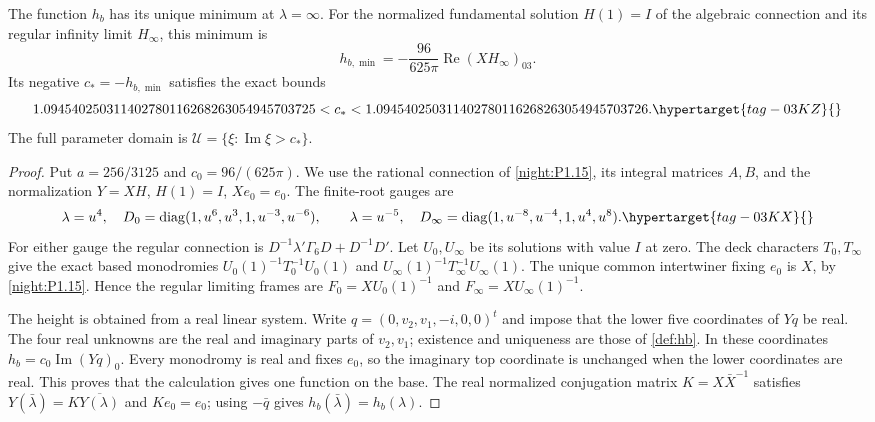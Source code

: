 \begin{theorem}
\hypertarget{tag-02QR}{}\label{night:P1.18}
The function $h_b$ has its unique minimum at $\lambda=\infty$.
For the normalized fundamental solution $H(1)=I$ of the algebraic
connection and its regular infinity limit $H_\infty$, this minimum is
\[
 h_{b,\min}=-\frac{96}{625\pi}\operatorname{Re}(XH_\infty)_{03}.
\]
Its negative $c_*=-h_{b,\min}$ satisfies the exact bounds
\[
 1.094540250311402780116268263054945703725<c_*
 <1.094540250311402780116268263054945703726.
 \hypertarget{tag-03KZ}{}\label{layout:V:fresh-bounds}
\]
The full parameter domain is $\mathcal U=\{\xi:\operatorname{Im}\xi>c_*\}$.
\end{theorem}
\begin{proof}
Put $a=256/3125$ and $c_0=96/(625\pi)$. We use the rational
connection of \cref{night:P1.15}, its integral matrices $A,B$,
and the normalization $Y=XH$, $H(1)=I$, $Xe_0=e_0$.
The finite-root gauges are
\[
 \lambda=u^4,\quad D_0=\operatorname{diag}(1,u^6,u^3,1,u^{-3},u^{-6}),
 \qquad
 \lambda=u^{-5},\quad D_\infty=
 \operatorname{diag}(1,u^{-8},u^{-4},1,u^4,u^8).
 \hypertarget{tag-03KX}{}\label{layout:V:fresh-gauges}
\]
For either gauge the regular connection is
$D^{-1}\lambda'\Gamma_6D+D^{-1}D'$.
Let $U_0,U_\infty$ be its solutions with value $I$ at zero.
The deck characters $T_0,T_\infty$ give the exact based
monodromies $U_0(1)^{-1}T_0^{-1}U_0(1)$ and
$U_\infty(1)^{-1}T_\infty^{-1}U_\infty(1)$.
The unique common intertwiner fixing $e_0$ is $X$, by
\cref{night:P1.15}. Hence the regular limiting frames are
$F_0=XU_0(1)^{-1}$ and $F_\infty=XU_\infty(1)^{-1}$.

The height is obtained from a real linear system. Write
$q=(0,v_2,v_1,-i,0,0)^t$ and impose that the lower five
coordinates of $Yq$ be real. The four real unknowns are the
real and imaginary parts of $v_2,v_1$; existence and uniqueness
are those of \cref{def:hb}. In these coordinates
$h_b=c_0\operatorname{Im}(Yq)_0$.
Every monodromy is real and fixes $e_0$, so the imaginary top
coordinate is unchanged when the lower coordinates are real.
This proves that the calculation gives one function on the base.
The real normalized conjugation matrix $K=X\bar X^{-1}$ satisfies
$Y(\bar\lambda)=K\overline{Y(\lambda)}$ and $Ke_0=e_0$;
using $-\bar q$ gives $h_b(\bar\lambda)=h_b(\lambda)$.


\end{proof}
